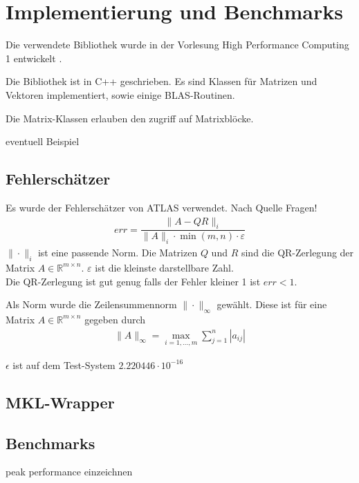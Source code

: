 \chapter{Implementierung und Benchmarks}
Die verwendete Bibliothek wurde in der Vorlesung High Performance Computing 1 entwickelt \cite{HPC1}.

Die Bibliothek ist in C++ geschrieben. Es sind Klassen für Matrizen und Vektoren implementiert, sowie einige BLAS-Routinen.

Die Matrix-Klassen erlauben den zugriff auf Matrixblöcke. 



eventuell Beispiel

\section{Fehlerschätzer}

Es wurde der Fehlerschätzer von ATLAS verwendet. Nach Quelle Fragen!
\begin{align}
	err = \dfrac{\|A - QR\|_i}{\|A\|_i \cdot \min(m,n) \cdot \varepsilon}
\end{align}
$\|\cdot\|_i$ ist eine passende Norm.
Die Matrizen $Q$ und $R$ sind die QR-Zerlegung der Matrix $A \in \mathbb{R}^{m \times n}$.
$\varepsilon$ ist die kleinste darstellbare Zahl.\\
Die QR-Zerlegung ist gut genug falls der Fehler kleiner 1 ist $ err < 1 $.

Als Norm wurde die Zeilensummennorm $\|\cdot\|_\infty$ gewählt.
Diese ist für eine Matrix $A \in \mathbb{R}^{m\times n}$ gegeben durch
\begin{align*}
	\|A\|_\infty = \max_{i=1,...,m} \sum_{j=1}^{n} |a_{ij}|
\end{align*}

$\epsilon$ ist auf dem Test-System $2.220446\cdot10^{-16}$

\section{MKL-Wrapper}

\section{Benchmarks}

peak performance einzeichnen